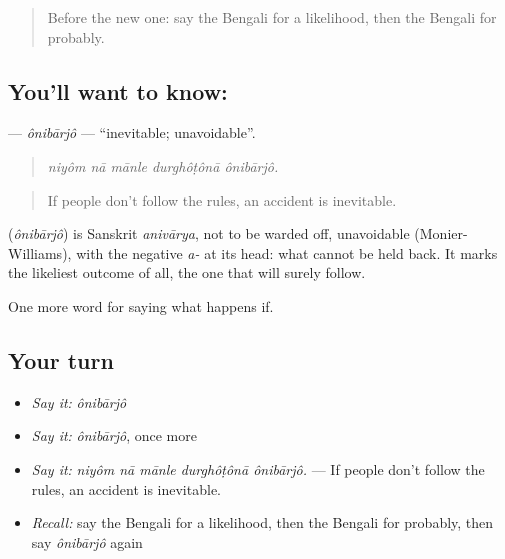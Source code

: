 \label{lesson:BN-C366-onibarjo}



\begin{quote}
Before the new one: say the Bengali for a likelihood, then the Bengali for probably.
\end{quote}

\subsection*{You'll want to know: }
\textbf{} — \emph{ônibārjô} — \textquotedblleft{}inevitable; unavoidable\textquotedblright{}.

\begin{quote}
    
\end{quote}

\begin{quote}
\emph{niyôm nā mānle durghôṭônā ônibārjô.}
\end{quote}

\begin{quote}
If people don't follow the rules, an accident is inevitable.
\end{quote}

\begin{cousinweb}
\textbf{} (\emph{ônibārjô}) is Sanskrit \emph{anivārya}, not to be warded off, unavoidable (Monier-Williams), with the negative \emph{a-} at its head: what cannot be held back. It marks the likeliest outcome of all, the one that will surely follow.
\end{cousinweb}

\begin{grammarlens}[title={What you've built}]
One more word for saying what happens if.
\end{grammarlens}

\subsection*{Your turn}
\begin{itemize}
\raggedright
  \item \emph{Say it:} \emph{ônibārjô}
  \item \emph{Say it:} \emph{ônibārjô}, once more
  \item \emph{Say it:} \emph{niyôm nā mānle durghôṭônā ônibārjô.} — If people don't follow the rules, an accident is inevitable.
  \item \emph{Recall:} say the Bengali for a likelihood, then the Bengali for probably, then say \emph{ônibārjô} again
\end{itemize}

